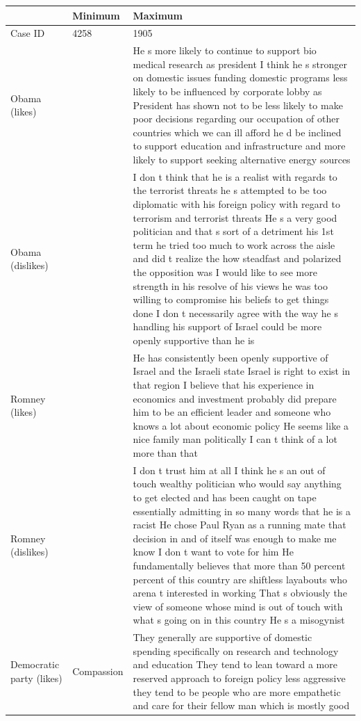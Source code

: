\documentclass[12pt]{article}
\begin{document}
\begin{longtable}[ht]{p{1.4cm}lp{12cm}}
  \hline
 & Minimum & Maximum \\ 
  \hline
Case ID & 4258 & 1905 \\ 
  Obama (likes) &  & He s more likely to continue to support bio medical research as president I think he s stronger on domestic issues funding domestic programs less likely to be influenced by corporate lobby as President has shown not to be less likely to make poor decisions regarding our occupation of other countries which we can ill afford he d be inclined to support education and infrastructure and more likely to support seeking alternative energy sources \\ 
  Obama (dislikes) &  & I don t think that he is a realist with regards to the terrorist threats he s attempted to be too diplomatic with his foreign policy with regard to terrorism and terrorist threats He s a very good politician and that s sort of a detriment his 1st term he tried too much to work across the aisle and did t realize the how steadfast and polarized the opposition was I would like to see more strength in his resolve of his views he was too willing to compromise his beliefs to get things done I don t necessarily agree with the way he s handling his support of Israel could be more openly supportive than he is \\ 
  Romney (likes) &  & He has consistently been openly supportive of Israel and the Israeli state Israel is right to exist in that region I believe that his experience in economics and investment probably did prepare him to be an efficient leader and someone who knows a lot about economic policy He seems like a nice family man politically I can t think of a lot more than that \\ 
  Romney (dislikes) &  & I don t trust him at all I think he s an out of touch wealthy politician who would say anything to get elected and has been caught on tape essentially admitting in so many words that he is a racist He chose Paul Ryan as a running mate that decision in and of itself was enough to make me know I don t want to vote for him He fundamentally believes that more than 50 percent percent of this country are shiftless layabouts who arena t interested in working That s obviously the view of someone whose mind is out of touch with what s going on in this country He s a misogynist \\ 
  Democratic party (likes) & Compassion & They generally are supportive of domestic spending specifically on research and technology and education They tend to lean toward a more reserved approach to foreign policy less aggressive they tend to be people who are more empathetic and care for their fellow man which is mostly good \\ 

\end{longtable}
\end{document}

